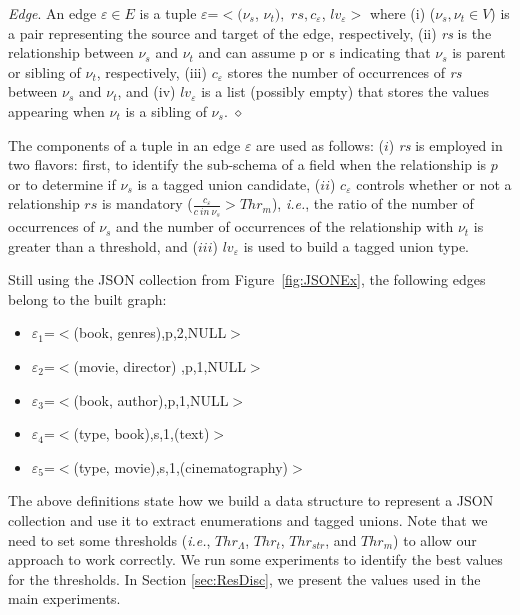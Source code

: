 \begin{definition} {\it Edge}. 
   An edge \(\varepsilon \in E\) is a tuple \(\varepsilon\)=\(<\)\((\nu_s\), \(\nu_t),\) \(rs, c_\varepsilon\), \(lv_\varepsilon\)\(>\) where (i) (\(\nu_s, \nu_t \in V\)) is a pair representing the source and target of the edge, respectively, (ii) \emph{rs} is the relationship between \(\nu_s\) and  \(\nu_t\) and can assume p or s indicating that \(\nu_s\) is parent or sibling of   \(\nu_t\), respectively, (iii) \(c_\varepsilon\) stores the number of occurrences of \emph{rs} between \(\nu_s\) and  \(\nu_t\), and (iv)  \(lv_\varepsilon\) is a list (possibly empty) that stores the values appearing when \(\nu_t\) is a sibling of \(\nu_s\).
   \hfill{$\diamond$}
   \label{GraphE}
\end{definition}

The components of a tuple in an edge $\varepsilon$ are used as follows: ($i$) \textit{rs} is employed in two flavors: first, to identify the sub-schema of a field when the relationship is $p$ or to determine if \(\nu_s\) is a tagged union candidate, ($ii$) \(c_\varepsilon\) controls whether or not a relationship $rs$ is mandatory (\(\frac{c_{\varepsilon}}{c~in~\nu_s} > Thr_m\)), \textit{i.e.}, the ratio of the number of occurrences of  $\nu_s$ and the number of occurrences of the relationship with  $\nu_t$ is greater than a threshold, and ($iii$) \(lv_\varepsilon\) is used to build a tagged union type.

\begin{example}
    Still using the JSON collection from Figure~\ref{fig:JSONEx}, the following edges belong to the built graph:
    \begin{itemize}
         \item \(\varepsilon_1\)=$<$(book, genres),p,2,NULL$>$
         \item \(\varepsilon_2\)=$<$(movie, director) ,p,1,NULL$>$
         \item \(\varepsilon_3\)=$<$(book, author),p,1,NULL$>$
         \item \(\varepsilon_4\)=$<$(type, book),s,1,(\textquotesingle text\textquotesingle)$>$
         \item \(\varepsilon_5\)=$<$(type, movie),s,1,(\textquotesingle cinematography\textquotesingle)$>$
    \end{itemize}
    
\end{example}

The above definitions state how we build a data structure to represent a JSON collection and use it to extract enumerations and tagged unions. 
Note that we need to set some thresholds (\textit{i.e.}, \(Thr_\Lambda\), \(Thr_t\), \(Thr_{str}\), and \(Thr_m\)) to allow our approach to work correctly. 
We run some experiments to identify the best values for the thresholds. 
In Section \ref{sec:ResDisc}, we present the values used in the main experiments.

